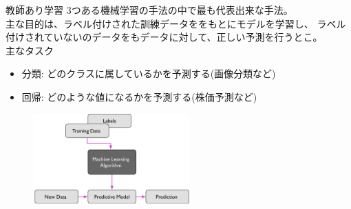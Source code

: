 \documentclass[aspectratio=169, dvipdfmx, 11pt]{beamer} %
\begin{document}
\begin{frame}{教師あり学習}
    3つある機械学習の手法の中で最も代表出来な手法。 \\
    主な目的は、ラベル付けされた訓練データををもとにモデルを学習し、
    ラベル付けされていないのデータをもデータに対して、正しい予測を行うとこ。\\
    主なタスク
    \begin{itemize}
        \item 分類: どのクラスに属しているかを予測する(画像分類など)
        \item 回帰: どのような値になるかを予測する(株価予測など)
    \end{itemize}
    \begin{figure}[b]
        \begin{center}
        \includegraphics[width=60mm]{img/day01/fig01.png}
        \end{center}
    \end{figure}        
\end{frame}
\end{document}
